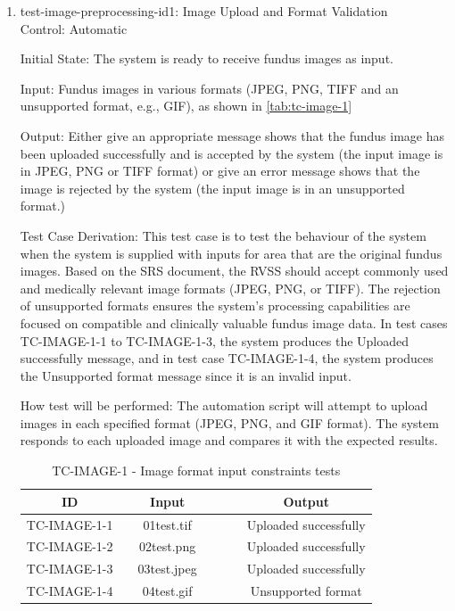 \documentclass[12pt, titlepage]{article}
\begin{document}
\begin{enumerate}

\item{test-image-preprocessing-id1: Image Upload and Format Validation \\}
\label{test-id-1}
Control: Automatic 
					
Initial State: The system is ready to receive fundus images as input. 
					
Input: Fundus images in various formats (JPEG, PNG, TIFF and an unsupported format, e.g., GIF), as shown in \autoref{tab:tc-image-1}
					
Output: Either give an appropriate message shows that the fundus image has been uploaded successfully and is accepted by the system (the input image is in JPEG, PNG or TIFF format) or give an error message shows that the image is rejected by the system (the input image is in an unsupported format.) 

Test Case Derivation: This test case is to test the behaviour of the system when the system is supplied with inputs for area that are the original fundus images. Based on the SRS document, the RVSS should accept commonly used and medically relevant image formats (JPEG, PNG, or TIFF). The rejection of unsupported formats ensures the system's processing capabilities are focused on compatible and clinically valuable fundus image data. In test cases TC-IMAGE-1-1 to TC-IMAGE-1-3, the system produces the Uploaded successfully message, and in test case TC-IMAGE-1-4, the system produces the Unsupported format message since it is an invalid input.    
					
How test will be performed: The automation script will attempt to upload images in each specified format (JPEG, PNG, and GIF format). The system responds to each uploaded image and compares it with the expected results.
\begin{center}
\begin{table}\centering
    \begin{tabular}{ lcccccc }    
    \hline
    \multicolumn{1}{c|}{ID} &     &   Input  &    &   \multicolumn{1}{c|}{}   &      &   Output    \\ \hline
    
    TC-IMAGE-1-1   &     &  01\underline{\hspace{0.5em}}test.tif &    &      &   & Uploaded successfully                    \\
    TC-IMAGE-1-2   &       & 02\underline{\hspace{0.5em}}test.png  &    &     &   & Uploaded successfully \\
    TC-IMAGE-1-3   &    & 03\underline{\hspace{0.5em}}test.jpeg  &   &     &    & Uploaded successfully\\
    TC-IMAGE-1-4   &    & 04\underline{\hspace{0.5em}}test.gif  &   &          &   & Unsupported format \\ 
    \hline    
   \end{tabular}  %
\caption{TC-IMAGE-1 - Image format input constraints tests}
\label{tab:tc-image-1}
\end{table}
\end{center}


\end{enumerate}
\end{document}
